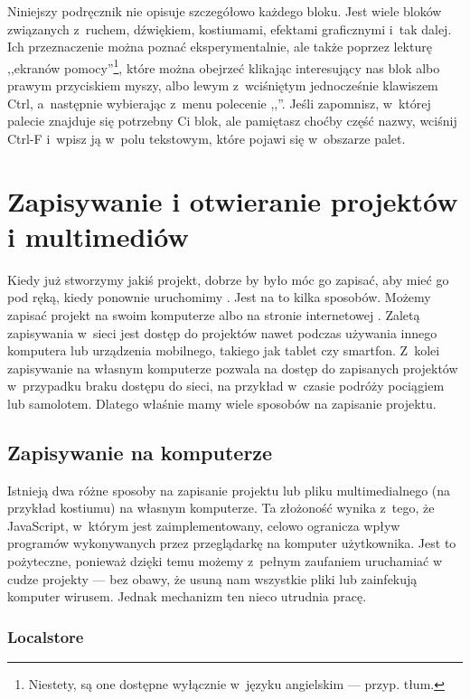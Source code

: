 \documentclass[a4paper]{report}
\begin{document}
Niniejszy podręcznik nie opisuje szczegółowo każdego bloku. Jest wiele bloków związanych z~ruchem, dźwiękiem, kostiumami, efektami graficznymi i~tak dalej. Ich przeznaczenie można poznać eksperymentalnie, ale także poprzez lekturę ,,ekranów pomocy''\footnote{Niestety, są one dostępne wyłącznie w~języku angielskim --- przyp. tłum.}, które można obejrzeć klikając interesujący nas blok albo prawym przyciskiem myszy, albo lewym z~wciśniętym jednocześnie klawiszem Ctrl, a~następnie wybierając z~menu polecenie ,,''. Jeśli zapomnisz, w~której palecie znajduje się potrzebny Ci blok, ale pamiętasz choćby część nazwy, wciśnij Ctrl-F i~wpisz ją w~polu tekstowym, które pojawi się w~obszarze palet.

\chapter{Zapisywanie i otwieranie projektów i multimediów}

Kiedy już stworzymy jakiś projekt, dobrze by było móc go zapisać, aby mieć go pod ręką, kiedy ponownie uruchomimy . Jest na to kilka sposobów. Możemy zapisać projekt na swoim komputerze albo na stronie internetowej . Zaletą zapisywania w~sieci jest dostęp do projektów nawet podczas używania innego komputera lub urządzenia mobilnego, takiego jak tablet czy smartfon. Z~kolei zapisywanie na własnym komputerze pozwala na dostęp do zapisanych projektów w~przypadku braku dostępu do sieci, na przykład w~czasie podróży pociągiem lub samolotem. Dlatego właśnie mamy wiele sposobów na zapisanie projektu.

\section{Zapisywanie na komputerze}

Istnieją dwa różne sposoby na zapisanie projektu lub pliku multimedialnego (na przykład kostiumu) na własnym komputerze. Ta złożoność wynika z~tego, że JavaScript, w~którym \Snap{} jest zaimplementowany, celowo ogranicza wpływ programów wykonywanych przez przeglądarkę na komputer użytkownika. Jest to pożyteczne, ponieważ dzięki temu możemy z~pełnym zaufaniem uruchamiać w~ cudze projekty --- bez obawy, że usuną nam wszystkie pliki lub zainfekują komputer wirusem. Jednak mechanizm ten nieco utrudnia pracę.

\subsection{Localstore}
\end{document}
